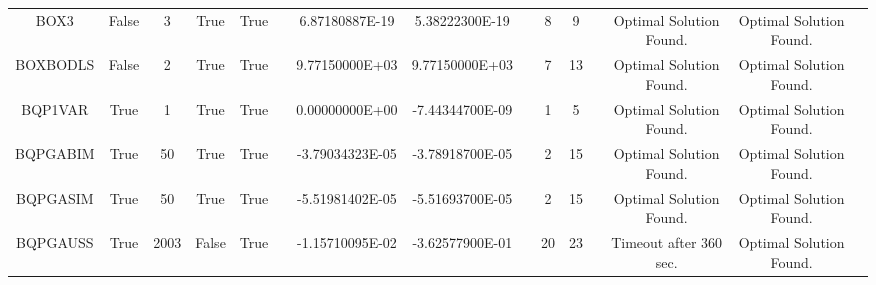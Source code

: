 \begin{longtable}{ccccccccccccccc}
	\cellcolor{default2} BOX3& \cellcolor{default2} False& \cellcolor{default2} 3& \cellcolor{default2} True& \cellcolor{default2} True& \cellcolor{header} & \cellcolor{ok} 6.87180887E-19& \cellcolor{best} 5.38222300E-19& \cellcolor{header} & \cellcolor{best} 8& \cellcolor{ok} 9& \cellcolor{header} & \cellcolor{default2} Optimal Solution Found.& \cellcolor{default2} Optimal Solution Found.& \cellcolor{header} \\
	\cellcolor{default1} BOXBODLS& \cellcolor{default1} False& \cellcolor{default1} 2& \cellcolor{default1} True& \cellcolor{default1} True& \cellcolor{header} & \cellcolor{best} 9.77150000E+03& \cellcolor{best} 9.77150000E+03& \cellcolor{header} & \cellcolor{best} 7& \cellcolor{ok} 13& \cellcolor{header} & \cellcolor{default1} Optimal Solution Found.& \cellcolor{default1} Optimal Solution Found.& \cellcolor{header} \\
	\cellcolor{default2} BQP1VAR& \cellcolor{default2} True& \cellcolor{default2} 1& \cellcolor{default2} True& \cellcolor{default2} True& \cellcolor{header} & \cellcolor{ok} 0.00000000E+00& \cellcolor{best} -7.44344700E-09& \cellcolor{header} & \cellcolor{best} 1& \cellcolor{poor} 5& \cellcolor{header} & \cellcolor{default2} Optimal Solution Found.& \cellcolor{default2} Optimal Solution Found.& \cellcolor{header} \\
	\cellcolor{default1} BQPGABIM& \cellcolor{default1} True& \cellcolor{default1} 50& \cellcolor{default1} True& \cellcolor{default1} True& \cellcolor{header} & \cellcolor{best} -3.79034323E-05& \cellcolor{ok} -3.78918700E-05& \cellcolor{header} & \cellcolor{best} 2& \cellcolor{poor} 15& \cellcolor{header} & \cellcolor{default1} Optimal Solution Found.& \cellcolor{default1} Optimal Solution Found.& \cellcolor{header} \\
	\cellcolor{default2} BQPGASIM& \cellcolor{default2} True& \cellcolor{default2} 50& \cellcolor{default2} True& \cellcolor{default2} True& \cellcolor{header} & \cellcolor{best} -5.51981402E-05& \cellcolor{ok} -5.51693700E-05& \cellcolor{header} & \cellcolor{best} 2& \cellcolor{poor} 15& \cellcolor{header} & \cellcolor{default2} Optimal Solution Found.& \cellcolor{default2} Optimal Solution Found.& \cellcolor{header} \\
	\cellcolor{default1} BQPGAUSS& \cellcolor{default1} True& \cellcolor{default1} 2003& \cellcolor{default1} False& \cellcolor{default1} True& \cellcolor{header} & \cellcolor{poor} -1.15710095E-02& \cellcolor{best} -3.62577900E-01& \cellcolor{header} & \cellcolor{best} 20& \cellcolor{ok} 23& \cellcolor{header} & \cellcolor{default1} Timeout after 360 sec.& \cellcolor{default1} Optimal Solution Found.& \cellcolor{header} \\

\end{longtable}
